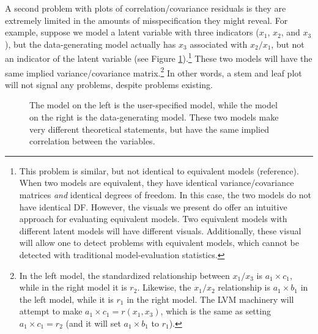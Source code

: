 \documentclass[
  english,
  doc]{apa6}
\begin{document}
A second problem with plots of correlation/covariance residuals is they are extremely limited in the amounts of misspecification they might reveal. For example, suppose we model a latent variable with three indicators (\(x_1\), \(x_2\), and \(x_3\)), but the data-generating model actually has \(x_3\) associated with \(x_2/x_1\), but not an indicator of the latent variable (see Figure \ref{fig:implied}).\footnote{This problem is similar, but not identical to equivalent models (reference). When two models are equivalent, they have identical variance/covariance matrices \emph{and} identical degrees of freedom. In this case, the two models do not have identical DF. However, the visuals we present do offer an intuitive approach for evaluating equivalent models. Two equivalent models with different latent models will have different visuals. Additionally, these visual will allow one to detect problems with equivalent models, which cannot be detected with traditional model-evaluation statistics.} These two models will have the same implied variance/covariance matrix.\footnote{In the left model, the standardized relationship between \(x_1/x_3\) is \(a_1\times c_1\), while in the right model it is \(r_2\). Likewise, the \(x_1/x_2\) relationship is \(a_1\times b_1\) in the left model, while it is \(r_1\) in the right model. The LVM machinery will attempt to make \(a_1\times c_1 = r(x_1, x_3)\), which is the same as setting \(a_1\times c_1 = r_2\) (and it will set \(a_1\times b_1\) to \(r_1\)).} In other words, a stem and leaf plot will not signal any problems, despite problems existing.

\begin{figure}
\begin{center}
\caption{The model on the left is the user-specified model, while the model on the right is the data-generating model. These two models make very different theoretical statements, but have the same implied correlation between the variables.}
\label{fig:implied}
\end{center}
\end{figure}
\end{document}
